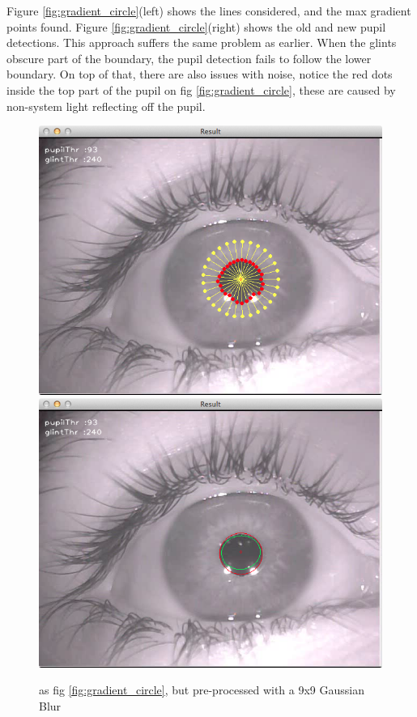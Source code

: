 \documentclass[a4paper,11pt]{article}
\begin{document}
Figure \ref{fig:gradient_circle}(left) shows the lines considered, and the max gradient points found. Figure \ref{fig:gradient_circle}(right) shows the old and new pupil detections. This approach suffers the same problem as earlier. When the glints obscure part of the boundary, the pupil detection fails to follow the lower boundary. On top of that, there are also issues with noise, notice the red dots inside the top part of the pupil on fig \ref{fig:gradient_circle}, these are caused by non-system light reflecting off the pupil.

\begin{figure}[ht]
  \centering
  \includegraphics[scale=0.25]{gradient_circle_gaussian_blur}
  \includegraphics[scale=0.25]{gradient_pupil_gaussian_blur}
  \caption{as fig \ref{fig:gradient_circle}, but pre-processed with a 9x9 Gaussian Blur}
  \label{fig:gradient_circle_gaussian_blur}
\end{figure}
\end{document}
